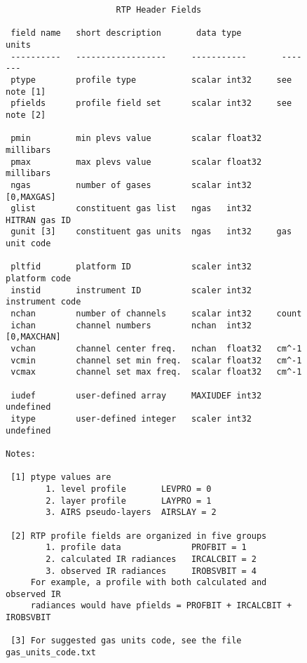 \documentclass[11pt]{article}
\begin{document}
\begin{figure}
\vskip-14mm
{\footnotesize
\begin{verbatim}
                      RTP Header Fields

 field name   short description       data type         units
 ----------   ------------------     -----------       -------
 ptype        profile type           scalar int32     see note [1]
 pfields      profile field set      scalar int32     see note [2]

 pmin         min plevs value        scalar float32   millibars
 pmax         max plevs value        scalar float32   millibars
 ngas         number of gases        scalar int32     [0,MAXGAS]
 glist        constituent gas list   ngas   int32     HITRAN gas ID
 gunit [3]    constituent gas units  ngas   int32     gas unit code

 pltfid       platform ID            scaler int32     platform code
 instid       instrument ID          scaler int32     instrument code
 nchan        number of channels     scalar int32     count
 ichan        channel numbers        nchan  int32     [0,MAXCHAN]
 vchan        channel center freq.   nchan  float32   cm^-1
 vcmin        channel set min freq.  scalar float32   cm^-1
 vcmax        channel set max freq.  scalar float32   cm^-1

 iudef        user-defined array     MAXIUDEF int32   undefined
 itype        user-defined integer   scaler int32     undefined

Notes:

 [1] ptype values are
        1. level profile       LEVPRO = 0
        2. layer profile       LAYPRO = 1
        3. AIRS pseudo-layers  AIRSLAY = 2

 [2] RTP profile fields are organized in five groups
        1. profile data              PROFBIT = 1
        2. calculated IR radiances   IRCALCBIT = 2
        3. observed IR radiances     IROBSVBIT = 4
     For example, a profile with both calculated and observed IR
     radiances would have pfields = PROFBIT + IRCALCBIT + IROBSVBIT

 [3] For suggested gas units code, see the file gas_units_code.txt

\end{verbatim}
}
\end{figure}
\end{document}
